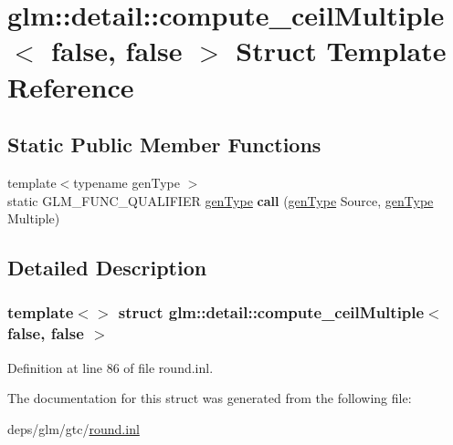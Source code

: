 \hypertarget{structglm_1_1detail_1_1compute__ceilMultiple_3_01false_00_01false_01_4}{}\section{glm\+:\+:detail\+:\+:compute\+\_\+ceil\+Multiple$<$ false, false $>$ Struct Template Reference}
\label{structglm_1_1detail_1_1compute__ceilMultiple_3_01false_00_01false_01_4}
\subsection*{Static Public Member Functions}
\begin{DoxyCompactItemize}
\item 
\mbox{\label{structglm_1_1detail_1_1compute__ceilMultiple_3_01false_00_01false_01_4_a42251f23ffbe25b624948a1128aa9957}} 
{\footnotesize template$<$typename gen\+Type $>$ }\\static G\+L\+M\+\_\+\+F\+U\+N\+C\+\_\+\+Q\+U\+A\+L\+I\+F\+I\+ER \hyperlink{structglm_1_1detail_1_1genType}{gen\+Type} {\bfseries call} (\hyperlink{structglm_1_1detail_1_1genType}{gen\+Type} Source, \hyperlink{structglm_1_1detail_1_1genType}{gen\+Type} Multiple)
\end{DoxyCompactItemize}


\subsection{Detailed Description}
\subsubsection*{template$<$$>$\newline
struct glm\+::detail\+::compute\+\_\+ceil\+Multiple$<$ false, false $>$}



Definition at line 86 of file round.\+inl.



The documentation for this struct was generated from the following file\+:\begin{DoxyCompactItemize}
\item 
deps/glm/gtc/\hyperlink{round_8inl}{round.\+inl}\end{DoxyCompactItemize}
